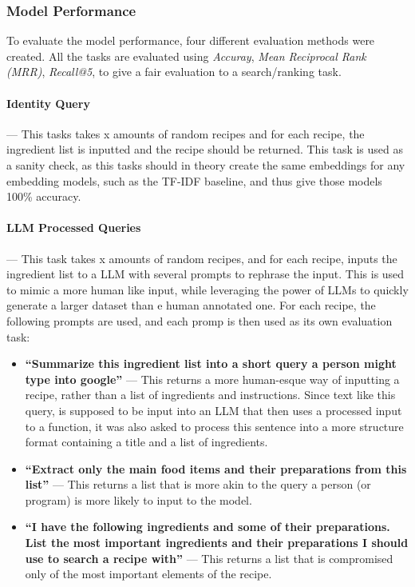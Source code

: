 \documentclass[11pt]{article}
\begin{document}
\subsubsection{Model Performance}\label{sec:modelperfomance}
To evaluate the model performance, four different evaluation methods were
created.
All the tasks are evaluated using \emph{Accuray},
\emph{Mean Reciprocal Rank (MRR)}, \emph{Recall@5}, to give a fair evaluation to
a search/ranking task.

\paragraph{Identity Query} --- This tasks takes x amounts of random recipes
and for each recipe, the ingredient list is inputted and the recipe should be
returned.
This task is used as a sanity check, as this tasks should in theory create the
same embeddings for any embedding models, such as the TF-IDF baseline, and thus
give those models 100\% accuracy.

\paragraph{LLM Processed Queries} --- This task takes x amounts of random
recipes, and for each recipe, inputs the ingredient list to a LLM with several
prompts to rephrase the input.
This is used to mimic a more human like input, while leveraging the power of
LLMs to quickly generate a larger dataset than e human annotated one.
For each recipe, the following prompts are used, and each promp is then used as
its own evaluation task:
\begin{itemize}
    \item \textbf{``Summarize this ingredient list into a short query a person might type
        into google''} --- This returns a more human-esque way of inputting a
        recipe, rather than a list of ingredients and instructions.
        Since text like this query, is supposed to be input into an LLM that
        then uses a processed input to a function, it was also asked to process
        this sentence into a more structure format containing a title and a list
        of ingredients.
    \item \textbf{``Extract only the main food items and their preparations from
        this list''} --- This returns a list that is more akin to the query a
        person (or program) is more likely to input to the model.
    \item \textbf{``I have the following ingredients and some of their
            preparations. List the most important ingredients and their
        preparations I should use to search a recipe with''} --- This returns a
        list that is compromised only of the most important elements of the
        recipe.
\end{itemize}
\end{document}
